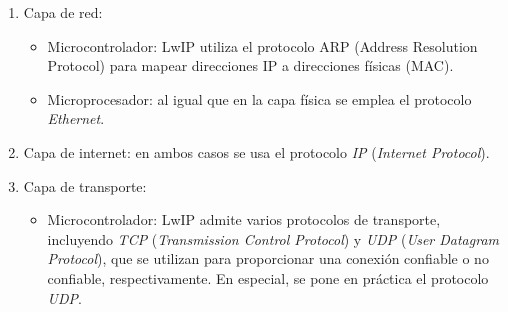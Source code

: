 \begin{enumerate}
   

  \item Capa de red: 

    \begin{itemize}

        \item Microcontrolador: LwIP utiliza el protocolo ARP (Address Resolution Protocol) para mapear direcciones IP a direcciones físicas (MAC).

        \item Microprocesador: al igual que en la capa física se emplea el protocolo \textit{Ethernet}.

    \end{itemize}
 
%      
%      



  \item Capa de internet: en ambos casos se usa el protocolo \textit{IP} (\textit{Internet Protocol}).
    



  \item Capa de transporte:

    \begin{itemize}

      \item Microcontrolador: LwIP admite varios protocolos de transporte, incluyendo \textit{TCP} (\textit{Transmission Control Protocol}) y \textit{UDP} (\textit{User Datagram Protocol}), que se utilizan para proporcionar una conexión confiable o no confiable, respectivamente. En especial, se pone en práctica el protocolo \textit{UDP}.


\end{itemize}
\end{enumerate}
